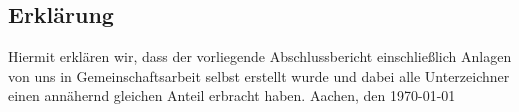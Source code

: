 \documentclass[a4paper, 12pt]{report}
\begin{document}
\begin{flushleft}
%
 
%
%
%
%
%
%
%
%


 


 
 \listoffigures
 
%
%
%
%
%
%
%
%
%
%
%
%
%
%
%
%
%

\chapter{Erklärung}
Hiermit erklären wir, dass der vorliegende Abschlussbericht einschließlich Anlagen von uns in Gemeinschaftsarbeit selbst erstellt wurde und dabei alle Unterzeichner einen annähernd gleichen Anteil erbracht haben.\newline \newline
Aachen, den \today
\newline \newline


\end{flushleft}
\end{document}
